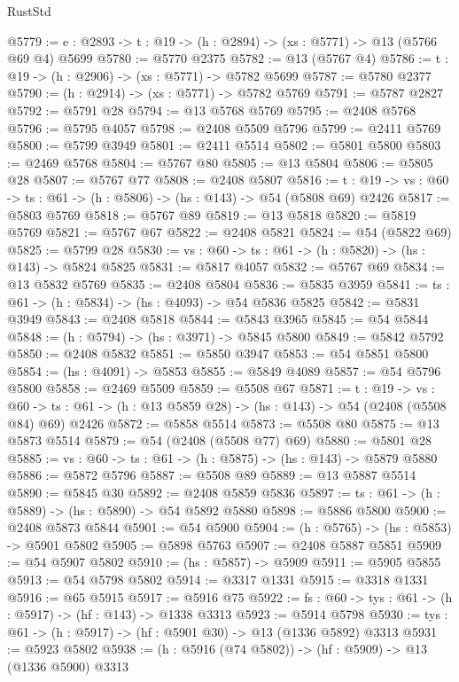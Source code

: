 \begin{lexlean}{RustStd}
\begin{coremodule}
@5779 := {e : @2893} -> {t : @19} -> (h : @2894) -> (xs : @5771) -> @13 (@5766 @69 @4) @5699
@5780 := @5770 @2375
@5782 := @13 (@5767 @4)
@5786 := {t : @19} -> (h : @2906) -> (xs : @5771) -> @5782 @5699
@5787 := @5780 @2377
@5790 := (h : @2914) -> (xs : @5771) -> @5782 @5769
@5791 := @5787 @2827
@5792 := @5791 @28
@5794 := @13 @5768 @5769
@5795 := @2408 @5768
@5796 := @5795 @4057
@5798 := @2408 @5509 @5796
@5799 := @2411 @5769
@5800 := @5799 @3949
@5801 := @2411 @5514
@5802 := @5801 @5800
@5803 := @2469 @5768
@5804 := @5767 @80
@5805 := @13 @5804
@5806 := @5805 @28
@5807 := @5767 @77
@5808 := @2408 @5807
@5816 := {t : @19} ->
  {vs : @60} -> {ts : @61} -> (h : @5806) -> (hs : @143) -> @54 (@5808 @69) @2426
@5817 := @5803 @5769
@5818 := @5767 @89
@5819 := @13 @5818
@5820 := @5819 @5769
@5821 := @5767 @67
@5822 := @2408 @5821
@5824 := @54 (@5822 @69)
@5825 := @5799 @28
@5830 := {vs : @60} -> {ts : @61} -> (h : @5820) -> (hs : @143) -> @5824 @5825
@5831 := @5817 @4057
@5832 := @5767 @69
@5834 := @13 @5832 @5769
@5835 := @2408 @5804
@5836 := @5835 @3959
@5841 := {ts : @61} -> (h : @5834) -> (hs : @4093) -> @54 @5836 @5825
@5842 := @5831 @3949
@5843 := @2408 @5818
@5844 := @5843 @3965
@5845 := @54 @5844
@5848 := (h : @5794) -> (hs : @3971) -> @5845 @5800
@5849 := @5842 @5792
@5850 := @2408 @5832
@5851 := @5850 @3947
@5853 := @54 @5851 @5800
@5854 := (hs : @4091) -> @5853
@5855 := @5849 @4089
@5857 := @54 @5796 @5800
@5858 := @2469 @5509
@5859 := @5508 @67
@5871 := {t : @19} ->
  {vs : @60} ->
  {ts : @61} -> (h : @13 @5859 @28) -> (hs : @143) -> @54 (@2408 (@5508 @84) @69) @2426
@5872 := @5858 @5514
@5873 := @5508 @80
@5875 := @13 @5873 @5514
@5879 := @54 (@2408 (@5508 @77) @69)
@5880 := @5801 @28
@5885 := {vs : @60} -> {ts : @61} -> (h : @5875) -> (hs : @143) -> @5879 @5880
@5886 := @5872 @5796
@5887 := @5508 @89
@5889 := @13 @5887 @5514
@5890 := @5845 @30
@5892 := @2408 @5859 @5836
@5897 := {ts : @61} -> (h : @5889) -> (hs : @5890) -> @54 @5892 @5880
@5898 := @5886 @5800
@5900 := @2408 @5873 @5844
@5901 := @54 @5900
@5904 := (h : @5765) -> (hs : @5853) -> @5901 @5802
@5905 := @5898 @5763
@5907 := @2408 @5887 @5851
@5909 := @54 @5907 @5802
@5910 := (hs : @5857) -> @5909
@5911 := @5905 @5855
@5913 := @54 @5798 @5802
@5914 := @3317 @1331
@5915 := @3318 @1331
@5916 := @65 @5915
@5917 := @5916 @75
@5922 := {fs : @60} -> {tys : @61} -> (h : @5917) -> (hf : @143) -> @1338 @3313
@5923 := @5914 @5798
@5930 := {tys : @61} -> (h : @5917) -> (hf : @5901 @30) -> @13 (@1336 @5892) @3313
@5931 := @5923 @5802
@5938 := (h : @5916 (@74 @5802)) -> (hf : @5909) -> @13 (@1336 @5900) @3313

\end{coremodule}
\end{lexlean}
